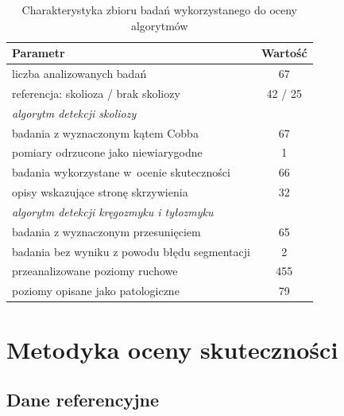 \begin{table}[H]
    \centering
    \captionsetup{justification=centering, font=small}
    \caption{Charakterystyka zbioru badań wykorzystanego do oceny algorytmów}
    \label{tab:zbior}
    \begin{tabular}{lc}
        \hline
        \textbf{Parametr}                              & \textbf{Wartość} \\
        \hline
        liczba analizowanych badań                     & 67               \\
        referencja: skolioza / brak skoliozy           & 42 / 25          \\
        \hline
        \multicolumn{2}{l}{\textit{algorytm detekcji skoliozy}} \\
        badania z wyznaczonym kątem Cobba              & 67               \\
        pomiary odrzucone jako niewiarygodne           & 1                \\
        badania wykorzystane w~ocenie skuteczności     & 66               \\
        opisy wskazujące stronę skrzywienia            & 32               \\
        \hline
        \multicolumn{2}{l}{\textit{algorytm detekcji kręgozmyku i tyłozmyku}} \\
        badania z wyznaczonym przesunięciem            & 65               \\
        badania bez wyniku z powodu błędu segmentacji  & 2                \\
        przeanalizowane poziomy ruchowe                & 455              \\
        poziomy opisane jako patologiczne              & 79               \\
        \hline
    \end{tabular}
\end{table}



\section{Metodyka oceny skuteczności}
\label{sec:metodyka-oceny}

\subsection{Dane referencyjne}
\label{subsec:referencje}


